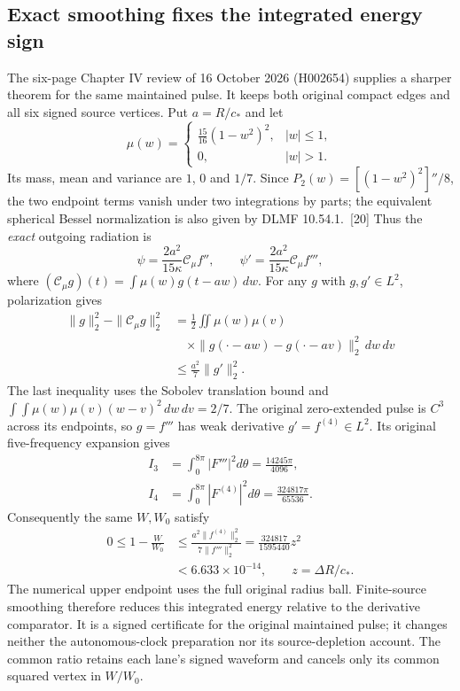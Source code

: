 \subsection{Exact smoothing fixes the integrated energy sign}
\label{subsec:signed-radiative-energy-update}
The six-page Chapter IV review of 16 October 2026 (H002654) supplies a sharper theorem for the same
maintained pulse. It keeps both original compact edges and all six signed
source vertices. Put $a=R/c_*$ and let
\[
 \mu(w)=\begin{cases}
  \frac{15}{16}(1-w^2)^2,&|w|\leq1,\\
  0,&|w|>1.
 \end{cases}
\]
Its mass, mean and variance are $1$, $0$ and $1/7$. Since
$P_2(w)=[(1-w^2)^2]''/8$, the two endpoint terms vanish under two
integrations by parts; the equivalent spherical Bessel normalization is also given by DLMF 10.54.1.~[20] Thus the \emph{exact} outgoing radiation is
\[
 \psi=\frac{2a^2}{15\kappa}\mathcal C_\mu f'',\qquad
 \psi'=\frac{2a^2}{15\kappa}\mathcal C_\mu f''',
\]
where $(\mathcal C_\mu g)(t)=\int\mu(w)g(t-aw)\,dw$.
For any $g$ with $g,g'\in L^2$, polarization gives
\begin{align*}
 \|g\|_2^2-\|\mathcal C_\mu g\|_2^2
 &=\frac12\iint\mu(w)\mu(v)\\[-2pt]
 &\quad\times\|g(\cdot-aw)-g(\cdot-av)\|_2^2\,dw\,dv\\
 &\leq\frac{a^2}{7}\|g'\|_2^2.
\end{align*}
The last inequality uses the Sobolev translation bound and
$\int\!\int\mu(w)\mu(v)(w-v)^2\,dw\,dv=2/7$.
The original zero-extended pulse is $C^3$ across its endpoints, so
$g=f'''$ has weak derivative $g'=f^{(4)}\in L^2$. Its original
five-frequency expansion gives
\[
 \begin{aligned}
 I_3&=\int_0^{8\pi}|F'''|^2d\theta=\frac{14245\pi}{4096},\\
 I_4&=\int_0^{8\pi}|F^{(4)}|^2d\theta=\frac{324817\pi}{65536}.
 \end{aligned}
\]
Consequently the same $W,W_0$ satisfy
\begin{align}
 0\leq1-\frac W{W_0}
 &\leq\frac{a^2\|f^{(4)}\|_2^2}{7\|f'''\|_2^2}
   =\frac{324817}{1595440}z^2\nonumber\\
 &<6.633\times10^{-14},\qquad z=\Delta R/c_*.
 \label{eq:signed-energy-deficit-update}
\end{align}
The numerical upper endpoint uses the full original radius ball.
Finite-source smoothing therefore reduces this integrated energy relative
to the derivative comparator. It is a signed certificate for the original
maintained pulse; it changes neither the autonomous-clock preparation nor
its source-depletion account. The common ratio retains each lane's signed
waveform and cancels only its common squared vertex in $W/W_0$.
